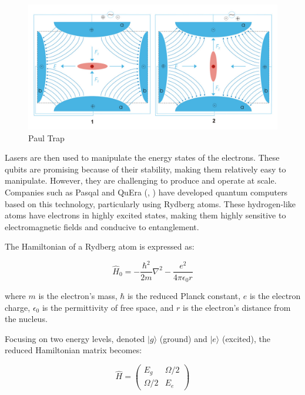 \documentclass{article}
\begin{document}
\begin{multicols}{2}
\begin{figure}[H]
    \centering
    \includegraphics[width=\columnwidth]{fig/Paul-Trap.png}
    \caption{Paul Trap}
    \label{fig:Paul_Trap}
\end{figure}

Lasers are then used to manipulate the energy states of the electrons. These qubits are promising because of their stability, making them relatively easy to manipulate. However, they are challenging to produce and operate at scale. Companies such as Pasqal and QuEra (\cite{wintersperger_neutral_2023}, \cite{noauthor_building_nodate}) have developed quantum computers based on this technology, particularly using Rydberg atoms. These hydrogen-like atoms have electrons in highly excited states, making them highly sensitive to electromagnetic fields and conducive to entanglement.

The Hamiltonian of a Rydberg atom is expressed as:

\begin{equation}
\hat{H}_0 = -\frac{\hbar^2}{2m}\nabla^2 - \frac{e^2}{4\pi\epsilon_0 r}
\end{equation}


where \( m \) is the electron’s mass, \( \hbar \) is the reduced Planck constant, \( e \) is the electron charge, \( \epsilon_0 \) is the permittivity of free space, and \( r \) is the electron’s distance from the nucleus.

Focusing on two energy levels, denoted \( |g\rangle \) (ground) and \( |e\rangle \) (excited), the reduced Hamiltonian matrix becomes:

\begin{equation}
\hat{H} = \begin{pmatrix}
E_g & \Omega/2 \\
\Omega/2 & E_e
\end{pmatrix}
\end{equation}



\end{multicols}
\end{document}
